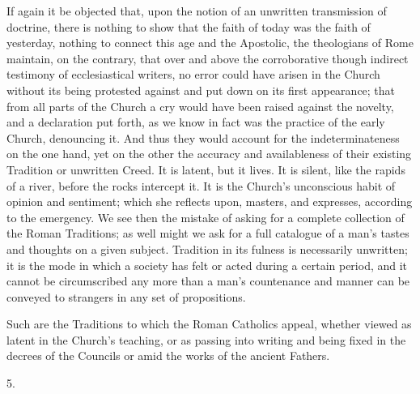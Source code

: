If again it be objected that, upon the notion of an unwritten
transmission of doctrine, there is nothing to show that the faith of
today was the faith of yesterday, nothing to connect this age and the
Apostolic, the theologians of Rome maintain, on the contrary, that
over and above the corroborative though indirect testimony of
ecclesiastical writers, no error could have arisen in the Church
without its being protested against and put down on its first
appearance; that from all parts of the Church a cry would have been
raised against the novelty, and a declaration put forth, as we know in
fact was the practice of the early Church, denouncing it. And thus
they would account for the indeterminateness on the one hand, yet on
the other the accuracy and availableness of their existing Tradition
or unwritten Creed. It is latent, but it lives. It is silent, like the
rapids of a river, before the rocks intercept it. It is the Church's
unconscious habit of opinion and sentiment; which she reflects upon,
masters, and expresses, according to the emergency. We see then the
mistake of asking for a complete collection of the Roman Traditions;
as well might we ask for a full catalogue of a man's tastes and
thoughts on a given subject. Tradition in its fulness is necessarily
unwritten; it is the mode in which a society has felt or acted during
a certain period, and it cannot be circumscribed any more than a man's
countenance and manner can be conveyed to strangers in any set of
propositions.

Such are the Traditions to which the Roman Catholics appeal,
whether viewed as latent in the Church's teaching, or as passing into
writing and being fixed in the decrees of the Councils or amid the
works of the ancient Fathers.

5.

